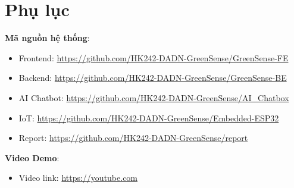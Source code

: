 \section{Phụ lục}

\textbf{Mã nguồn hệ thống}:
\begin{itemize}
    \item Frontend: \href{https://github.com/HK242-DADN-GreenSense/GreenSense-FE}{https://github.com/HK242-DADN-GreenSense/GreenSense-FE}
    \item Backend: \href{https://github.com/HK242-DADN-GreenSense/GreenSense-BE}{https://github.com/HK242-DADN-GreenSense/GreenSense-BE}
    \item AI Chatbot: \href{https://github.com/HK242-DADN-GreenSense/AI_Chatbox}{https://github.com/HK242-DADN-GreenSense/AI\_Chatbox}
    \item IoT: \href{https://github.com/HK242-DADN-GreenSense/Embedded-ESP32}{https://github.com/HK242-DADN-GreenSense/Embedded-ESP32}
    \item Report: \href{https://github.com/HK242-DADN-GreenSense/report}{https://github.com/HK242-DADN-GreenSense/report}
\end{itemize}

\textbf{Video Demo}:
\begin{itemize}
    \item Video link:  \href{https://youtube.com}{https://youtube.com}
\end{itemize}